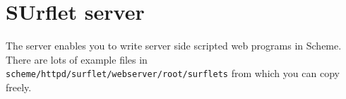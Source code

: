 \chapter{SUrflet server}

\newcommand{\typew}[1]{\texttt{#1}}

The \surflet server enables you to write server side scripted web
programs in Scheme.  
There are lots of example files in
\typew{scheme/httpd/surflet/webserver/root/surflets} from which you
can copy freely.




